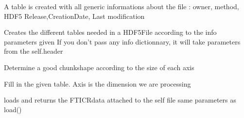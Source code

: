 \documentclass[letterpaper,10pt,openany,oneside]{sphinxmanual}
\begin{document}
\begin{fulllineitems}
\begin{fulllineitems}
\end{fulllineitems}


\begin{fulllineitems}
\label{rst/code:File.HDF5File.HDF5File.create_generic}
A table is created with all generic informations about the file : owner, method, HDF5 Release,CreationDate, Last modification

\end{fulllineitems}


\begin{fulllineitems}
\label{rst/code:File.HDF5File.HDF5File.create_tables}
Creates the different tables needed in a HDF5File according to the info parameters given 
If you don't pass any info dictionnary, it will take parameters from the self.header

\end{fulllineitems}


\begin{fulllineitems}
\label{rst/code:File.HDF5File.HDF5File.determine_chunkshape}
Determine a good chunkshape according to the size of each axis

\end{fulllineitems}


\begin{fulllineitems}
\label{rst/code:File.HDF5File.HDF5File.fill_table}
Fill in the given table. Axis is the dimension we are processing

\end{fulllineitems}


\begin{fulllineitems}
\label{rst/code:File.HDF5File.HDF5File.get_data}
loads and returns the FTICRdata attached to the self file
same parameters as load()


\end{fulllineitems}
\end{fulllineitems}
\end{document}
